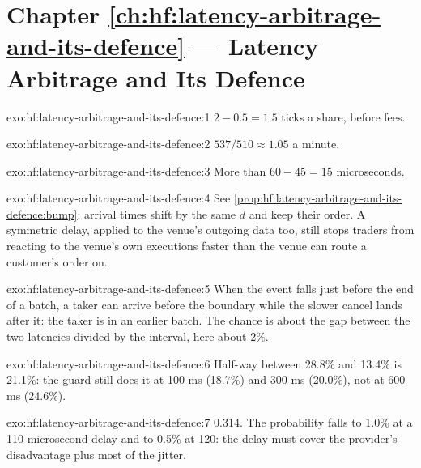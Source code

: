 \section*{Chapter \ref{ch:hf:latency-arbitrage-and-its-defence} --- Latency Arbitrage and Its Defence}

\begin{solution}{exo:hf:latency-arbitrage-and-its-defence:1}
$2-0.5=1.5$ ticks a share, before fees.
\end{solution}

\begin{solution}{exo:hf:latency-arbitrage-and-its-defence:2}
$537/510\approx1.05$ a minute.
\end{solution}

\begin{solution}{exo:hf:latency-arbitrage-and-its-defence:3}
More than $60-45=15$ microseconds.
\end{solution}

\begin{solution}{exo:hf:latency-arbitrage-and-its-defence:4}
See \cref{prop:hf:latency-arbitrage-and-its-defence:bump}: arrival times shift by the same $d$ and keep their order. A symmetric delay, applied to the
venue's outgoing data too, still stops traders from reacting to the venue's own executions faster than the venue can route a customer's order on.
\end{solution}

\begin{solution}{exo:hf:latency-arbitrage-and-its-defence:5}
When the event falls just before the end of a batch, a taker can arrive before the boundary while the slower cancel lands after it: the taker is in
an earlier batch. The chance is about the gap between the two latencies divided by the interval, here about 2\%.
\end{solution}

\begin{solution}{exo:hf:latency-arbitrage-and-its-defence:6}
Half-way between 28.8\% and 13.4\% is 21.1\%: the guard still does it at 100 ms (18.7\%) and 300 ms (20.0\%), not at 600 ms (24.6\%).
\end{solution}

\begin{solution}{exo:hf:latency-arbitrage-and-its-defence:7}
0.314. The probability falls to 1.0\% at a 110-microsecond delay and to 0.5\% at 120: the delay must cover the provider's disadvantage plus most of
the jitter.
\end{solution}

